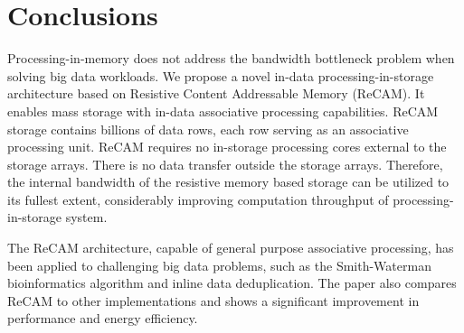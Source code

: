 \documentclass{superfri}
\begin{document}
	
	\section{Conclusions}
	
	Processing-in-memory does not address the bandwidth bottleneck problem when solving big data workloads. We propose a novel in-data processing-in-storage architecture based on Resistive Content Addressable Memory (ReCAM). It enables mass storage with in-data associative processing capabilities. ReCAM storage contains billions of data rows, each row serving as an associative processing unit. ReCAM requires no in-storage processing cores external to the storage arrays. There is no data transfer outside the storage arrays. Therefore, the internal bandwidth of the resistive memory based storage can be utilized to its fullest extent, considerably improving computation throughput of processing-in-storage system.
	
	The ReCAM architecture, capable of general purpose associative processing, has been applied to challenging big data problems, such as the Smith-Waterman bioinformatics algorithm and inline data deduplication. The paper also compares ReCAM to other implementations and shows a significant improvement in performance and energy efficiency. 
	
	
	
	
	
\end{document}

